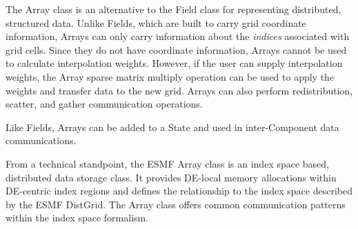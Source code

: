 %


The Array class is an alternative to the Field class for representing 
distributed, structured data.  Unlike Fields, which are built to carry 
grid coordinate information, Arrays can only carry information about the 
{\it indices} associated with grid cells.  Since they do not have coordinate 
information, Arrays cannot be used to calculate interpolation weights.  
However, if the user can supply interpolation weights, the Array sparse 
matrix multiply operation can be used to apply the weights and transfer 
data to the new grid.  Arrays can also perform redistribution, scatter, 
and gather communication operations.

Like Fields, Arrays can be added to a State and used in inter-Component 
data communications.

From a technical standpoint, the ESMF Array class is an index space 
based, distributed data storage class. It provides DE-local memory allocations 
within DE-centric index regions and defines the relationship to the index 
space described by the ESMF DistGrid. The Array class offers common 
communication patterns within the index space formalism.

